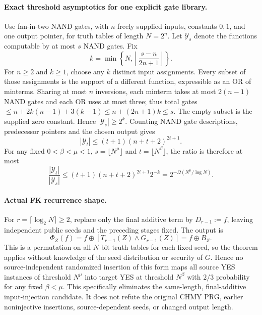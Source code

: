 \documentclass[11pt]{article}
\begin{document}
\paragraph{Exact threshold asymptotics for one explicit gate library.}
Use fan-in-two NAND gates, with $n$ freely supplied inputs, constants $0,1$, and one output pointer, for truth tables of length $N=2^n$. Let $\mathcal Y_s$ denote the functions computable by at most $s$ NAND gates. Fix
\[
k=\min\left\{N,\left\lfloor\frac{s-n}{2n+1}\right\rfloor\right\}.
\]
For $n\ge2$ and $k\ge1$, choose any $k$ distinct input assignments. Every subset of those assignments is the support of a different function, expressible as an OR of minterms. Sharing at most $n$ inversions, each minterm takes at most $2(n-1)$ NAND gates and each OR uses at most three; thus total gates $\le n+2k(n-1)+3(k-1)\le n+(2n+1)k\le s$. The empty subset is the supplied zero constant. Hence $|\mathcal Y_s|\ge2^k$. Counting NAND gate descriptions, predecessor pointers and the chosen output gives
\[
|\mathcal Y_t|\le(t+1)(n+t+2)^{2t+1}.
\]
For any fixed $0<\beta<\mu<1$, $s=\lfloor N^\mu\rfloor$ and $t=\lfloor N^\beta\rfloor$, the ratio is therefore at most
\[
\frac{|\mathcal Y_t|}{|\mathcal Y_s|}
\le(t+1)(n+t+2)^{2t+1}2^{-k}
=2^{-\Omega(N^\mu/\log N)}.
\]

\paragraph{Actual FK recurrence shape.}
For $r=\lceil\log_2N\rceil\ge2$, replace only the final additive term by $D_{r-1}:=f$, leaving independent public seeds and the preceding stages fixed. The output is
\[
\Phi_Z(f)=f\oplus[T_{r-1}(Z)\wedge G_{r-1}(Z)]
=f\oplus B_Z.
\]
This is a permutation on all $N$-bit truth tables for each fixed seed, so the theorem applies without knowledge of the seed distribution or security of $G$. Hence no source-independent randomized insertion of this form maps all source YES instances of threshold $N^\mu$ into target YES at threshold $N^\beta$ with $2/3$ probability for any fixed $\beta<\mu$. This specifically eliminates the same-length, final-additive input-injection candidate. It does not refute the original CHMY PRG, earlier noninjective insertions, source-dependent seeds, or changed output length.
\end{document}
